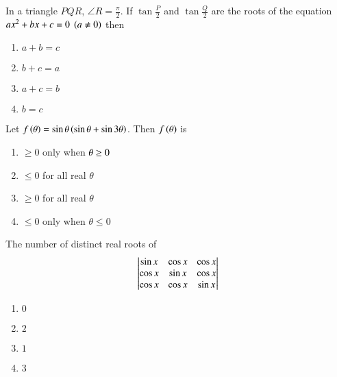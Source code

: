 \item In a triangle $PQR$, $\angle R = \frac{\pi}{2}$. If $\tan{\frac{P}{2}}$ and $\tan{\frac{Q}{2}}$ are the roots of the equation $ax^2+bx+c=0 \;\left(a\neq0\right)$ then
        
        \hfill{}
        \begin{enumerate}
                \item $a+b=c$
                \item $b+c=a$
                \item $a+c=b$ 
                \item $b=c$
        \end{enumerate}

    \item Let $f\left(\theta\right) = \sin{\theta}\left(\sin{\theta} + \sin{3\theta}\right)$. Then $f\left(\theta\right)$ is
        
        \hfill{}
        \begin{enumerate}
                \item $\ge0$ only when $\theta\newline\ge0$
                \item $\le0$ for all real $\theta$
                \item $\ge0$ for all real $\theta$
                \item $\le0$ only when $\theta\le0$
        \end{enumerate}

    \item The number of distinct real roots of
    \begin{align*}
	    \begin{vmatrix}
		\sin{x}&\cos{x}&\cos{x}\\
    		\cos{x}&\sin{x}&\cos{x}\\
		\cos{x}&\cos{x}&\sin{x}\end{vmatrix}
    \end{align*}

        \hfill{}
        \begin{enumerate}
                \item $0$
                \item $2$
                \item $1$
                \item $3$
        \end{enumerate}

